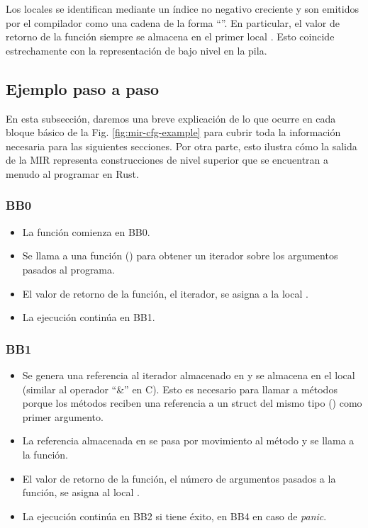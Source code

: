 Los locales se identifican mediante un índice no negativo creciente y son emitidos por el
compilador como una cadena de la forma ``''.
En particular, el valor de retorno de la función siempre se almacena en el primer local .
Esto coincide estrechamente con la representación de bajo nivel en la pila.

\subsection{Ejemplo paso a paso}

En esta subsección, daremos una breve explicación de lo que ocurre en cada bloque básico de
la Fig. \ref{fig:mir-cfg-example} para cubrir toda la información necesaria
para las siguientes secciones.
Por otra parte, esto ilustra cómo la salida de la \acrshort{MIR} representa
construcciones de nivel superior que se encuentran a menudo al programar en Rust.

\subsubsection{BB0}

\begin{itemize}
    \item La función  comienza en BB0.
    \item Se llama a una función () para obtener
          un iterador sobre los argumentos pasados al programa.
    \item El valor de retorno de la función, el iterador, se asigna a la local .
    \item La ejecución continúa en BB1.
\end{itemize}

\subsubsection{BB1}

\begin{itemize}
    \item Se genera una referencia al iterador almacenado en 
          y se almacena en el local  (similar al operador ``\&'' en C).
          Esto es necesario para llamar a métodos porque los
          métodos reciben una referencia a un struct del mismo tipo () como primer
          argumento.
    \item La referencia almacenada en  se pasa por movimiento
          al método 
          y se llama a la función.
    \item El valor de retorno de la función, el número de argumentos pasados a la función,
          se asigna al local .
    \item La ejecución continúa en BB2 si tiene éxito, en BB4 en caso de \textit{panic}.
\end{itemize}

